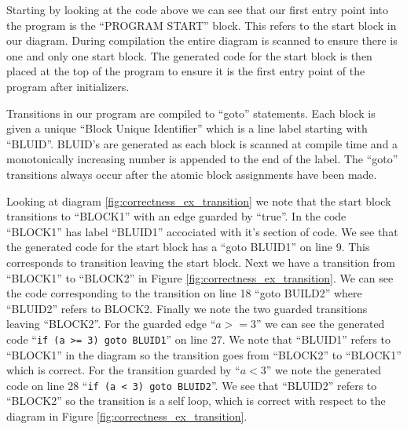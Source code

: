 Starting by looking at the code above we can see that our first entry point into the program is the ``PROGRAM START'' block. This refers to the start block in our diagram. During compilation the entire diagram is scanned to ensure there is one and only one start block. The generated code for the start block is then placed at the top of the program to ensure it is the first entry point of the program after initializers. 

Transitions in our program are compiled to ``goto'' statements. Each block is given a unique ``Block Unique Identifier'' which is a line label starting with ``BLUID''. BLUID's are generated as each block is scanned at compile time and a monotonically increasing number is appended to the end of the label. The ``goto'' transitions always occur after the atomic block assignments have been made.

Looking at diagram \ref{fig:correctness_ex_transition} we note that the start block transitions to ``BLOCK1'' with an edge guarded by ``true''. In the code ``BLOCK1'' has label ``BLUID1'' accociated with it's section of code. We see that the generated code for the start block has a ``goto BLUID1'' on line 9. This corresponds to transition leaving the start block. Next we have a transition from ``BLOCK1'' to ``BLOCK2'' in Figure \ref{fig:correctness_ex_transition}. We can see the code corresponding to the transition on line 18 ``goto BUILD2'' where ``BLUID2'' refers to BLOCK2. Finally we note the two guarded transitions leaving ``BLOCK2''. For the guarded edge ``$a >= 3$'' we can see the generated code ``\texttt{if (a >= 3) goto BLUID1}'' on line 27. We note that ``BLUID1'' refers to ``BLOCK1'' in the diagram so the transition goes from ``BLOCK2'' to ``BLOCK1'' which is correct. For the transition guarded by ``$a < 3$'' we note the generated code on line 28 ``\texttt{if (a < 3) goto BLUID2}''. We see that ``BLUID2'' refers to ``BLOCK2'' so the transition is a self loop, which is correct with respect to the diagram in Figure \ref{fig:correctness_ex_transition}.





